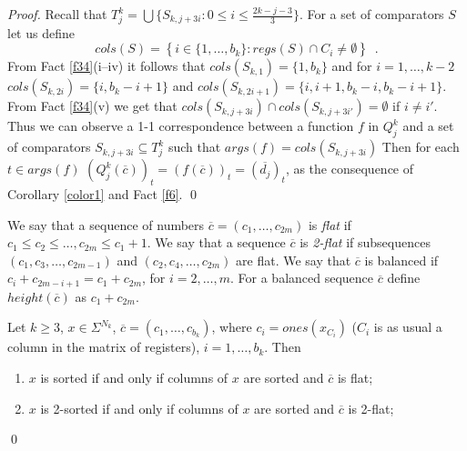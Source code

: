 \documentclass{llncs}
\begin{document}
\begin{proof}
Recall that $T^k_j=\bigcup\{S_{k,j+3i}: 0\le i\le
\frac{2k-j-3}{3}\}$. For a set of comparators $S$ let us define
$$ cols(S) = \left\{ i\in\{1,\ldots,b_k\}: regs(S)\cap C_i\neq\emptyset
\right\} \enspace .$$ From Fact \ref{f34}(i--iv) it follows that
$cols(S_{k,1})=\{1,b_k\}$ and for $i=1,\ldots,k-2$ $cols(S_{k,2i}) =
\{i,b_k-i+1\}$ and $ cols(S_{k,2i+1}) = \{i, i+1, b_k-i, b_k-i+1\}
$. From Fact \ref{f34}(v) we get that $ cols(S_{k,j+3i}) \cap
cols(S_{k,j+3i'}) = \emptyset $ if $i\neq i'$. Thus we can observe a 1-1
correspondence between a function $f$ in $Q^k_j$ and a set of
comparators $S_{k,j+3i} \subseteq T^k_j$ such that
$args(f)=cols(S_{k,j+3i})$ Then for each $t\in args(f)$
$(Q^k_j(\overline{c}))_t = (f(\overline{c}))_t = (\overline{d_j})_t$, as
the consequence of Corollary \ref{color1} and Fact \ref{f6}. \qed
\end{proof}
\begin{definition} \label{flat}
We say that a sequence of numbers $\overline{c} = (c_1,\ldots,c_{2m})$
is {\em flat} if $c_1\le c_2\le \ldots, c_{2m}\le c_1 + 1$. We say that
a sequence $\overline{c}$ is {\em 2-flat} if subsequences
$(c_1,c_3,\ldots,c_{2m-1})$ and $(c_2,c_4,\ldots,c_{2m})$ are flat. We
say that $\overline{c}$ is balanced if $c_i+c_{2m-i+1} = c_1+c_{2m}$,
for $i=2,\ldots,m$. For a balanced sequence $\overline{c}$ define 
$height(\overline{c})$ as $c_1+c_{2m}$.
\end{definition}
\begin{proposition} \label{p3}
Let $k\ge 3$, $x\in \Sigma^{N_k}$, $\overline{c} =
(c_1,\ldots,c_{b_k})$, where $c_i=ones(x_{C_i})$ ($C_i$ is as usual a
column in the matrix of registers), $i=1,\ldots,b_k$. Then
\begin{enumerate}
\item $x$ is sorted if and only if columns of $x$ are sorted  and 
$\overline{c}$ is flat;
\item $x$ is 2-sorted if and only if columns of $x$ are sorted and 
$\overline{c}$ is 2-flat;
\end{enumerate}
\end{proposition} \qed
\end{document}
